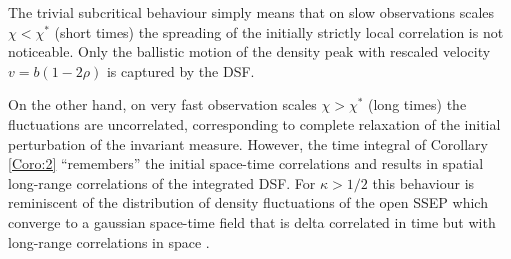 \documentclass[12pt]{article}
\begin{document}
The trivial subcritical behaviour simply means that on slow 
observations scales $\chi < \chi^\ast$ (short times) the
spreading of the initially strictly local correlation
is not noticeable. Only the ballistic motion of the density peak
with rescaled velocity $v=b(1-2\rho)$ is captured by the DSF.

On the other hand, on very fast observation scales 
$\chi > \chi^\ast$ (long times) the fluctuations are uncorrelated,
corresponding to complete relaxation of the initial perturbation
of the invariant measure. However, the time integral
of Corollary \ref{Coro:2} ``remembers'' the initial 
space-time correlations and results in spatial long-range
correlations of the integrated DSF. For $\kappa > 1/2$ this 
behaviour is reminiscent of the distribution of density fluctuations 
of the open SSEP which converge to a gaussian space-time
field that is delta correlated in time but with long-range correlations 
in space \cite{Bern23}. 
\end{document}
